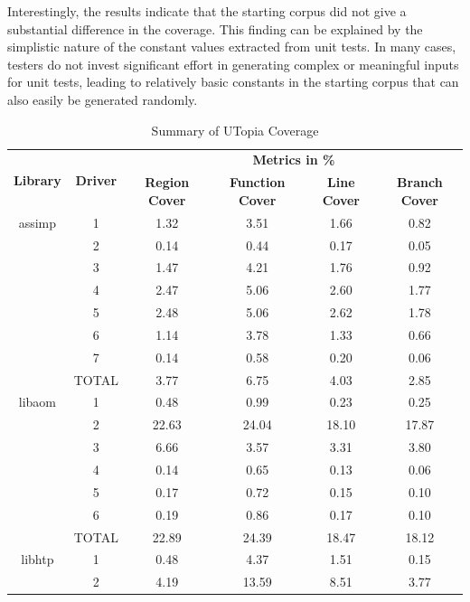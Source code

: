\documentclass[a4paper,11pt,oneside]{report}
\begin{document}
Interestingly, the results indicate that the starting corpus 
did not give a substantial difference in the coverage. 
This finding can be explained by the simplistic nature 
of the constant values extracted from unit tests. In many cases, 
testers do not invest significant effort in generating 
complex or meaningful inputs for unit tests, leading to 
relatively basic constants in the starting corpus that can also easily be 
generated randomly.






\begin{table}[h]
  \centering
  \caption{Summary of UTopia Coverage}
  \label{tab:coverage_utopia}
  \begin{tabular}{|c|c|c|c|c|c|}
    \hline
    \multirow{2}{*}{\textbf{Library}} & \multirow{2}{*}{\textbf{Driver}} & \multicolumn{4}{c|}{\textbf{Metrics in \%}} \\
    \cline{3-6}
     &  & \textbf{Region Cover} & \textbf{Function Cover} & \textbf{Line Cover} & \textbf{Branch Cover}\\
    \hline
    \multirow{1}{*}{assimp} & 1 & 1.32 & 3.51 & 1.66 & 0.82  \\
     & 2 & 0.14 & 0.44 & 0.17 & 0.05 \\
     & 3 & 1.47 & 4.21 & 1.76 & 0.92  \\
     & 4 & 2.47 & 5.06 & 2.60 & 1.77 \\
     & 5 & 2.48 & 5.06 & 2.62 & 1.78 \\
     & 6 & 1.14 & 3.78 & 1.33 & 0.66  \\
     & 7 & 0.14 & 0.58 & 0.20 & 0.06 \\
     \hline
     & TOTAL & 3.77 & 6.75 & 4.03 & 2.85  \\
    \hline
    \multirow{1}{*}{libaom} & 1 & 0.48 & 0.99 & 0.23 & 0.25 \\
     & 2 & 22.63 & 24.04 & 18.10 & 17.87 \\
     & 3 & 6.66 & 3.57 & 3.31 & 3.80  \\
     & 4 & 0.14 & 0.65 & 0.13 & 0.06 \\
     & 5 & 0.17 & 0.72 & 0.15 & 0.10 \\
     & 6 & 0.19 & 0.86 & 0.17 & 0.10  \\
     \hline
     & TOTAL & 22.89 & 24.39 & 18.47 & 18.12  \\
    \hline
    \multirow{1}{*}{libhtp} & 1 & 0.48 & 4.37 & 1.51 & 0.15 \\
     & 2 & 4.19 & 13.59 & 8.51 & 3.77 \\

\end{tabular}
\end{table}
\end{document}
